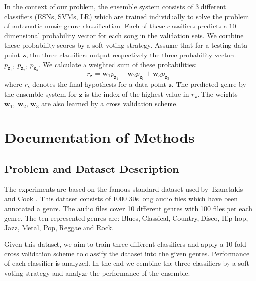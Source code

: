 \documentclass[a4paper,11pt,oneside]{article}
\begin{document}
In the context of our problem, the ensemble system consists of 3 different classifiers (ESNs, SVMs, LR) 
which are trained individually to solve the problem of automatic music genre classification. 
Each of these classifiers predicts a $10$ dimensional probability vector for each song in the validation sets.
We combine these probability scores by a soft voting strategy. Assume that for a testing data point $\mathbf{z}$,
the three classifiers output respectively the three probability vectors $p_{\mathbf{z}_1},\ p_{\mathbf{z}_2},\ p_{\mathbf{z}_3}$.
We calculate a weighted sum of these probabilities:
\begin{equation}
  r_\mathbf{z} = \mathbf{w}_1p_{\mathbf{z}_1} + \mathbf{w}_2p_{\mathbf{z}_2} + \mathbf{w}_3p_{\mathbf{z}_3}
\end{equation}
where $r_\mathbf{z}$ denotes the final hypothesis for a data point $\mathbf{z}$. The predicted genre by the ensemble
system for $\mathbf{z}$ is the index of the highest value in $r_\mathbf{z}$. The weights $\mathbf{w}_1,\
\mathbf{w}_2,\ \mathbf{w}_3$ are also learned by a cross validation scheme.

\section{Documentation of Methods}
\subsection{Problem and Dataset Description}
The experiments are based on the famous standard dataset used by Tzanetakis and Cook \cite{tzan}.
This dataset consists of 1000 30s long audio files which have been annotated a genre. 
The audio files cover 10 different genres with 100 files per each genre. The ten represented genres
are: Blues, Classical, Country, Disco, Hip-hop, Jazz, Metal, Pop, Reggae and Rock.

Given this dataset, we aim to train three different classifiers and apply a 10-fold 
cross validation scheme to classify the dataset into the given genres. Performance of 
each classifier is analyzed. In the end we combine the three classifiers by a soft-voting 
strategy and analyze the performance of the ensemble. 
\end{document}
